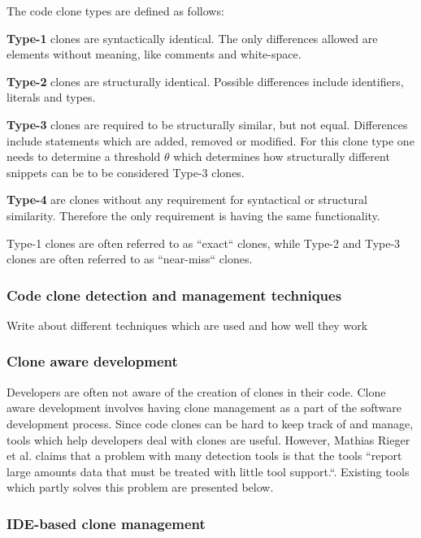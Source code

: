 \documentclass[12pt]{article}
\begin{document}
The code clone types are defined as follows:

\textbf{Type-1} clones are syntactically identical. The only differences allowed are elements
without meaning, like comments and white-space. 

\textbf{Type-2} clones are structurally identical. Possible differences include
identifiers, literals and types. 

\textbf{Type-3} clones are required to be structurally similar, but not equal. Differences
include statements which are added, removed or modified. For this clone type one needs to
determine a threshold $\theta$ which determines how structurally different snippets can be
to be considered Type-3 clones.\cite{Inoue_introduction_to_cc}

\textbf{Type-4} are clones without any requirement for syntactical or structural similarity. Therefore
the only requirement is having the same functionality.

Type-1 clones are often referred to as ``exact`` clones, while Type-2 and Type-3 clones are
often referred to as ``near-miss`` clones.\cite[1]{Zibran_real_time_search}

\subsubsection{Code clone detection and management techniques}

Write about different techniques which are used and how well they work

\subsubsection{Clone aware development}

Developers are often not aware of the creation of clones in their code. Clone aware
development involves having clone management as a part of the software development
process. Since code clones can be hard to keep track of and manage, tools which help
developers deal with clones are useful. However, Mathias Rieger et al. claims that
a problem with many detection tools is that the tools ``report large amounts data that must
be treated with little tool support.``\cite[1]{InsightsSystemWideDuplication}. Existing
tools which partly solves this problem are presented below. 
\subsubsection{IDE-based clone management}
\end{document}
